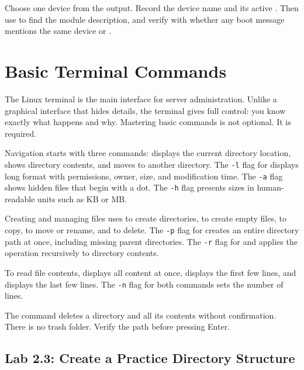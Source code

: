 \begin{challengebox}
Choose one device from the  output. Record the device name and its active . Then use  to find the module description, and verify with  whether any boot message mentions the same device or .
\end{challengebox}

\section{Basic Terminal Commands}
\label{sec:basic-commands}

The Linux terminal is the main interface for server administration. Unlike a graphical interface that hides details, the terminal gives full control: you know exactly what happens and why. Mastering basic commands is not optional. It is required.

Navigation starts with three commands:  displays the current directory location,  shows directory contents, and  moves to another directory. The \texttt{-l} flag for  displays long format with permissions, owner, size, and modification time. The \texttt{-a} flag shows hidden files that begin with a dot. The \texttt{-h} flag presents sizes in human-readable units such as KB or MB.

Creating and managing files uses  to create directories,  to create empty files,  to copy,  to move or rename, and  to delete. The \texttt{-p} flag for  creates an entire directory path at once, including missing parent directories. The \texttt{-r} flag for  and  applies the operation recursively to directory contents.

To read file contents,  displays all content at once,  displays the first few lines, and  displays the last few lines. The \texttt{-n} flag for both commands sets the number of lines.

\begin{warningbox}
The  command deletes a directory and all its contents without confirmation. There is no trash folder. Verify the path before pressing Enter.
\end{warningbox}

\subsection*{Lab 2.3: Create a Practice Directory Structure}

